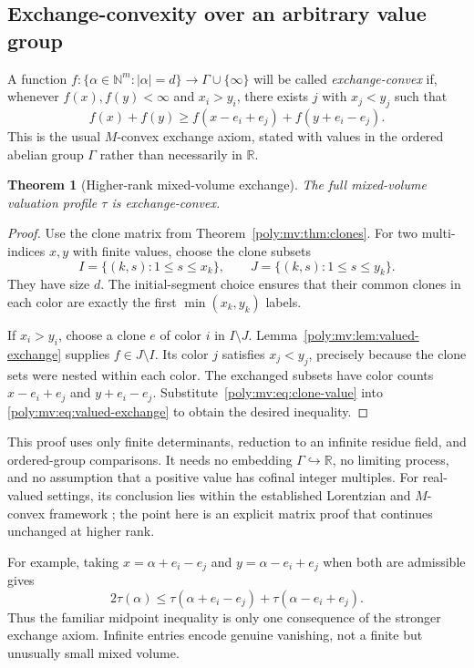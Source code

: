 \documentclass[11pt,a4paper]{article}
\numberwithin{equation}{section}
\newtheorem{theorem}{Theorem}[section]
\theoremstyle{plain}
\newcommand{\R}{\mathbb R}
\newcommand{\N}{\mathbb N}
\begin{document}
\subsection{Exchange-convexity over an arbitrary value group}
\begin{definition}\label{poly:mv:def:exchange-convex}
A function $f:\{\alpha\in\N^m:|\alpha|=d\}\to\Gamma\cup\{\infty\}$
will be called \emph{exchange-convex} if, whenever $f(x),f(y)<\infty$
and $x_i>y_i$, there exists $j$ with $x_j<y_j$ such that
\[
 f(x)+f(y)\ge f(x-e_i+e_j)+f(y+e_i-e_j).
\]
This is the usual $M$-convex exchange axiom, stated with values in the
ordered abelian group $\Gamma$ rather than necessarily in $\R$.
\end{definition}

\begin{theorem}[Higher-rank mixed-volume exchange]
\label{poly:mv:thm:mconvex}
The full mixed-volume valuation profile $\tau$ is exchange-convex.
\end{theorem}
\begin{proof}
Use the clone matrix from Theorem~\ref{poly:mv:thm:clones}. For two multi-indices
$x,y$ with finite values, choose the clone subsets
\[
 I=\{(k,s):1\le s\le x_k\},\qquad
 J=\{(k,s):1\le s\le y_k\}.
\]
They have size $d$. The initial-segment choice ensures that their common
clones in each color are exactly the first $\min(x_k,y_k)$ labels.

If $x_i>y_i$, choose a clone $e$ of color $i$ in $I\setminus J$.
Lemma~\ref{poly:mv:lem:valued-exchange} supplies $f\in J\setminus I$. Its color
$j$ satisfies $x_j<y_j$, precisely because the clone sets were nested
within each color. The exchanged subsets have color counts
$x-e_i+e_j$ and $y+e_i-e_j$. Substitute~\eqref{poly:mv:eq:clone-value} into
\eqref{poly:mv:eq:valued-exchange} to obtain the desired inequality.
\end{proof}

This proof uses only finite determinants, reduction to an infinite
residue field, and ordered-group comparisons. It needs no embedding
$\Gamma\hookrightarrow\R$, no limiting process, and no assumption that a
positive value has cofinal integer multiples. For real-valued settings,
its conclusion lies within the established Lorentzian and $M$-convex
framework \cite{mv:BH}; the point here is an explicit matrix proof that
continues unchanged at higher rank.

For example, taking $x=\alpha+e_i-e_j$ and
$y=\alpha-e_i+e_j$ when both are admissible gives
\[
 2\tau(\alpha)\le
 \tau(\alpha+e_i-e_j)+\tau(\alpha-e_i+e_j).
\]
Thus the familiar midpoint inequality is only one consequence of the
stronger exchange axiom. Infinite entries encode genuine vanishing,
not a finite but unusually small mixed volume.
\end{document}
